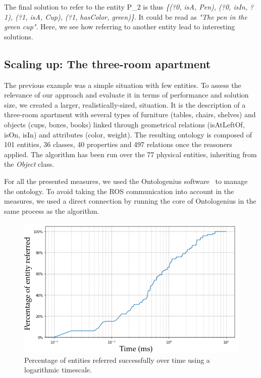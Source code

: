 The final solution to refer to the entity P\_2 is thus \textit{\{(?0, isA, Pen), (?0, isIn, ?1), (?1, isA, Cup), (?1, hasColor, green)\}}. It could be read as \textit{"The pen in the green cup"}. Here, we see how referring to another entity lead to interesting solutions.


\subsection{Scaling up: The three-room apartment}

The previous example was a simple situation with few entities. To assess the relevance of our approach and evaluate it in terms of performance and solution size, we created a larger, realistically-sized, situation. It is the description of a three-room apartment with several types of furniture (tables, chairs, shelves) and objects (cups, boxes, books) linked through geometrical relations (isAtLeftOf, isOn, isIn) and attributes (color, weight). The resulting ontology is composed of 101 entities, 36 classes, 40 properties and 497 relations once the reasoners applied. The algorithm has been run over the 77 physical entities, inheriting from the \textit{Object} class.

For all the presented measures, we used the Ontologenius software~\cite{sarthou_2019_ontologenius} to manage the ontology. To avoid taking the ROS communication into account in the measures, we used a direct connection by running the core of Ontologenius in the same process as the algorithm.

\begin{figure}[h!]
\centering
\includegraphics[scale=0.55]{figures/chapter4/scaling_up_percentage.png}
\caption{\label{fig:chap4_percentage} Percentage of entities referred successfully over time using a logarithmic timescale. }
\end{figure}

